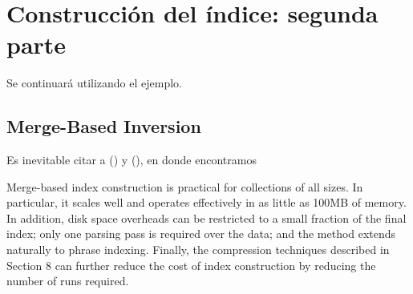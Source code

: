 \section{Construcción del índice: segunda parte}

Se continuará utilizando el ejemplo.

\subsection{Merge-Based Inversion}

Es inevitable citar a \citet[p. ~14]{Zobel06invertedfiles} (\citeyear{Zobel06invertedfiles}) y \citet[p.~238]{WittenMoffatBell99} (\citeyear{WittenMoffatBell99}), en donde encontramos

Merge-based index construction is practical for collections of all sizes. In particular,
it scales well and operates effectively in as little as 100MB of memory. In addition, disk
space overheads can be restricted to a small fraction of the final index; only one parsing
pass is required over the data; and the method extends naturally to phrase indexing.
Finally, the compression techniques described in Section 8 can further reduce the cost
of index construction by reducing the number of runs required.




